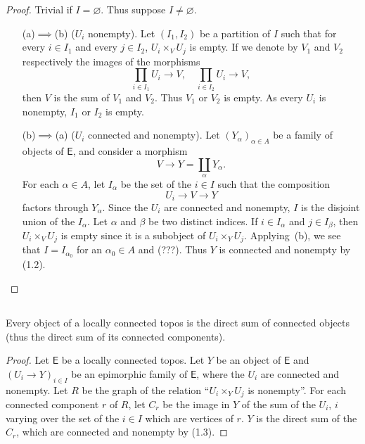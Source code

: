 \documentclass[10pt,oneside]{amsart}
\newcommand{\oldpage}[1]{\marginnote{\textbf{#1}}}
\newcommand{\cat}{\mathsf}
\begin{document}
\begin{proof}
Trivial if $I=\varnothing$.
Thus suppose $I\neq\varnothing$.
\begin{enumerate}
  \item[(a)$\implies$(b)] ($U_i$ nonempty). Let $(I_1,I_2)$ be a partition of $I$ such that for every $i\in I_1$ and every $j\in I_2$, $U_i\times_V U_j$ is empty.
    If we denote by $V_1$ and $V_2$ respectively the images of the morphisms
    \[
      \prod_{i\in I_1}U_i\longrightarrow V,\quad\prod_{i\in I_2}U_i\longrightarrow V,
    \]
    then $V$ is the sum of $V_1$ and $V_2$.
    Thus $V_1$ or $V_2$ is empty.
    As every $U_i$ is nonempty, $I_1$ or $I_2$ is empty.
  \item[(b)$\implies$(a)] ($U_i$ connected and nonempty). Let $(Y_\alpha)_{\alpha\in A}$ be a family of objects of $\cat{E}$, and consider a morphism
    \[
      V\longrightarrow Y=\coprod_\alpha Y_\alpha.
    \]
    For each $\alpha\in A$, let $I_\alpha$ be the set of the $i\in I$ such that the composition
    \[
      U_i\longrightarrow V\longrightarrow Y
    \]
    factors through $Y_\alpha$.
    Since the $U_i$ are connected and nonempty, $I$ is the disjoint union of the $I_\alpha$.
    Let $\alpha$ and $\beta$ be two distinct indices.
    If $i\in I_\alpha$ and $j\in I_\beta$, then $U_i\times_V U_j$ is empty since it is a subobject of $U_i\times_Y U_j$.
    Applying~(b), we see that $I=I_{\alpha_0}$ for an $\alpha_0\in A$ and (???).
    Thus $Y$ is connected and nonempty by (1.2).
\end{enumerate}
\end{proof}

\subsection{}
\oldpage{3}
Every object of a locally connected topos is the direct sum of connected objects (thus the direct sum of its connected components).

\begin{proof}
Let $\cat{E}$ be a locally connected topos.
Let $Y$ be an object of $\cat{E}$ and $(U_i\to Y)_{i\in I}$ be an epimorphic family of $\cat{E}$, where the $U_i$ are connected and nonempty.
Let $R$ be the graph of the relation ``$U_i\times_Y U_j$ is nonempty''.
For each connected component $r$ of $R$, let $C_r$ be the image in $Y$ of the sum of the $U_i$, $i$ varying over the set of the $i\in I$ which are vertices of $r$.
$Y$ is the direct sum of the $C_r$, which are connected and nonempty by (1.3).
\end{proof}
\end{document}
